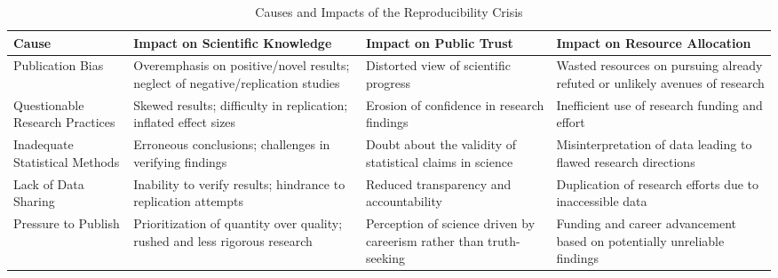 \documentclass{article}
\begin{document}
\renewcommand{\arraystretch}{1.5}

\begin{table}[ht]
    \centering
    \caption{Causes and Impacts of the Reproducibility Crisis}
    \label{table:reproducibility_crisis} %
    \begin{tabularx}{\textwidth}{|X|X|X|X|}
        \hline
        Cause                                            & Impact on Scientific Knowledge                                                  & Impact on Public Trust                                              & Impact on Resource Allocation                                                                           \\
        \hline
        Publication Bias                                 & Overemphasis on positive/novel results; neglect of negative/replication studies & Distorted view of scientific progress                               & Wasted resources on pursuing already refuted or unlikely avenues of research                            \\
        \hline
        Questionable Research Practices                  & Skewed results; difficulty in replication; inflated effect sizes                & Erosion of confidence in research findings                          & Inefficient use of research funding and effort                                                          \\
        \hline
        Inadequate Statistical Methods                   & Erroneous conclusions; challenges in verifying findings                         & Doubt about the validity of statistical claims in science           & Misinterpretation of data leading to flawed research directions                                         \\
        \hline
        Lack of Data Sharing                             & Inability to verify results; hindrance to replication attempts                  & Reduced transparency and accountability                             & Duplication of research efforts due to inaccessible data                                                \\
        \hline
        Pressure to Publish                              & Prioritization of quantity over quality; rushed and less rigorous research      & Perception of science driven by careerism rather than truth-seeking & Funding and career advancement based on potentially unreliable findings                                 \\

\end{tabularx}
\end{table}
\end{document}
